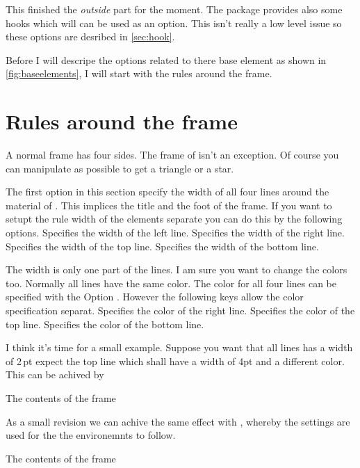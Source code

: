 \documentclass[openany,12pt,tocdepth=3]{ltx-md}
\begin{document}
\vspace*{\baselineskip}
This finished the \emph{outside} part for the moment. The package provides also some hooks
which will can be used as an option. This isn't really a low level issue so these
options are desribed in \autoref{sec:hook}. 

\vspace*{\baselineskip}
Before I will descripe the options related to there base element as shown in \autoref{fig:baseelements}, 
I will start with the rules around the frame.

\section{Rules around the frame}\label{sec:lines}
A normal frame has four sides. The frame of  isn't an exception. Of course
you can manipulate as possible to get a triangle or a star.

The first option in this section specify the width of all four lines around the material of .
This implices the title and the foot of the frame. If you want to setupt the rule width of the elements
separate you can do this by the following options.
Specifies the width of the left line.
Specifies the width of the right line.
Specifies the width of the top line.
Specifies the width of the bottom line.

The width is only one part of the lines. I am sure you want to change the colors too. 
Normally all lines have the same color. The color for all four lines can be specified 
with the Option . However the following keys allow the color
specification separat.
Specifies the color of the right line.
Specifies the color of the top line.
Specifies the color of the bottom line.

I think it's time for a small example. Suppose you want that all lines has a width of
2\,pt expect the top line which shall have a width of 4pt and a different color.
This can be achived by
\begin{ltxexample}[caption=Example outer part,label=outer,result=true,]
 \begin{xframed}[line-width=2pt,line-width-top=4pt,
          line-color-top=blue]
   The contents of the frame
 \end{xframed}
\end{ltxexample}
As a small revision we can achive the same effect with , 
whereby the settings are used for the the environemnts  to follow.
\begin{ltxexample}[caption={Example outer part II},]
 \xframedsetup[line-width=2pt,line-width-top=4pt
           ,line-color-top=blue]
 \begin{xframed}
   The contents of the frame
 \end{xframed}
\end{ltxexample}
\end{document}
